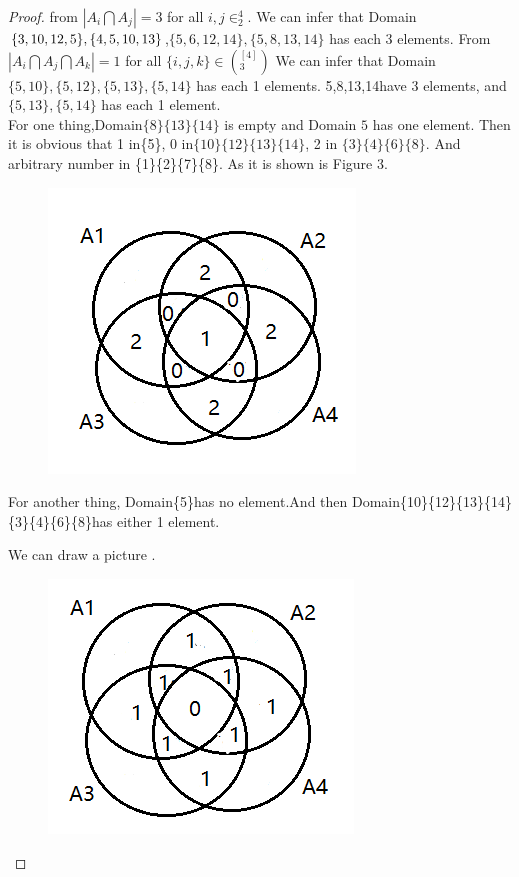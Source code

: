 \documentclass[12pt,a4]{article}
\begin{document}
\begin{proof}
    from $|A_i\bigcap A_j| = 3$ for all ${i,j} \in ^4_2$.
    We can infer that Domain$\{3,10,12,5\},\\
    \{4,5,10,13\}$,$\{5,6,12,14\},\{5,8,13,14\}$ has each 3 elements.
    From$|A_i\bigcap A_j\bigcap A_k| = 1$ for all $\{i,j,k\}\in (^{[4]}_{3})$
    We can infer that Domain$\{5,10\},\{5,12\},\{5,13\},\{5,14\}$ has each 1 elements.
    {5,8,13,14}have 3 elements, and $\{5,13\} , \{5,14\}$ has each 1 element.\\
    For one thing,Domain$\{8\}\{13\}\{14\}$ is empty and Domain ${5}$ has one element.
    Then it is obvious that 1 in\{5\}, 0 in$\{10\}\{12\}\{13\}\{14\}$, 2 in $\{3\}\{4\}\{6\}\{8\}$. And arbitrary number in \{1\}\{2\}\{7\}\{8\}.
    As it is shown is Figure 3.\\
    \begin{figure}[h]
	\begin{center}
		\includegraphics[width=0.32\linewidth]{Exercise3.1-2.png}
		\caption{}
		\label{Fig:2}
	\end{center}
	\vspace{-0.5em}
    \end{figure}

    For another thing, Domain\{5\}has no element.And then Domain\{10\}\{12\}\{13\}\{14\}\{3\}\{4\}\{6\}\{8\}has either 1 element.

    We can draw a picture .
     \begin{figure}[h]
	\begin{center}
		\includegraphics[width=0.32\linewidth]{Exercise3.1-3.png}
		\caption{}
		\label{Fig:3}
	\end{center}
	\vspace{-0.5em}
    \end{figure}
\end{proof}
\end{document}
